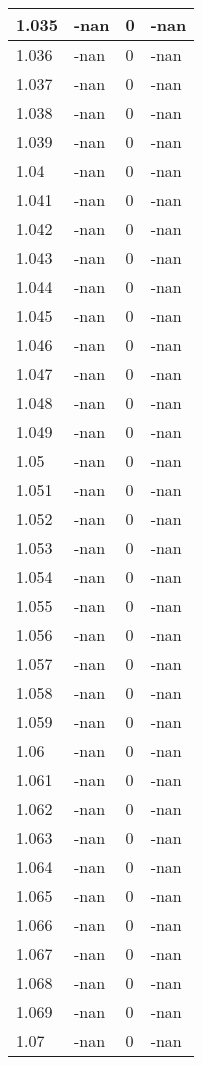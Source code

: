 \documentclass[a4paper,14pt]{extarticle}
\begin{document}
\begin{longtable}{||m{3cm}||m{3cm}|m{3cm}||m{3cm}||}
\hline
1.035 & -nan & 0 & -nan\\
\hline
1.036 & -nan & 0 & -nan\\
\hline
1.037 & -nan & 0 & -nan\\
\hline
1.038 & -nan & 0 & -nan\\
\hline
1.039 & -nan & 0 & -nan\\
\hline
1.04 & -nan & 0 & -nan\\
\hline
1.041 & -nan & 0 & -nan\\
\hline
1.042 & -nan & 0 & -nan\\
\hline
1.043 & -nan & 0 & -nan\\
\hline
1.044 & -nan & 0 & -nan\\
\hline
1.045 & -nan & 0 & -nan\\
\hline
1.046 & -nan & 0 & -nan\\
\hline
1.047 & -nan & 0 & -nan\\
\hline
1.048 & -nan & 0 & -nan\\
\hline
1.049 & -nan & 0 & -nan\\
\hline
1.05 & -nan & 0 & -nan\\
\hline
1.051 & -nan & 0 & -nan\\
\hline
1.052 & -nan & 0 & -nan\\
\hline
1.053 & -nan & 0 & -nan\\
\hline
1.054 & -nan & 0 & -nan\\
\hline
1.055 & -nan & 0 & -nan\\
\hline
1.056 & -nan & 0 & -nan\\
\hline
1.057 & -nan & 0 & -nan\\
\hline
1.058 & -nan & 0 & -nan\\
\hline
1.059 & -nan & 0 & -nan\\
\hline
1.06 & -nan & 0 & -nan\\
\hline
1.061 & -nan & 0 & -nan\\
\hline
1.062 & -nan & 0 & -nan\\
\hline
1.063 & -nan & 0 & -nan\\
\hline
1.064 & -nan & 0 & -nan\\
\hline
1.065 & -nan & 0 & -nan\\
\hline
1.066 & -nan & 0 & -nan\\
\hline
1.067 & -nan & 0 & -nan\\
\hline
1.068 & -nan & 0 & -nan\\
\hline
1.069 & -nan & 0 & -nan\\
\hline
1.07 & -nan & 0 & -nan\\

\end{longtable}
\end{document}
